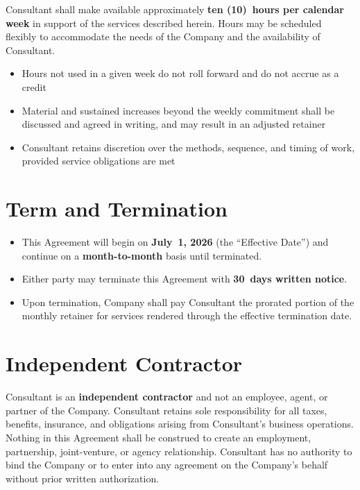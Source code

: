 \documentclass{toospoint}
\begin{document}
Consultant shall make available approximately \textbf{ten (10)~hours per
calendar week} in support of the services described herein. Hours may be
scheduled flexibly to accommodate the needs of the Company and the
availability of Consultant.

\begin{itemize}[leftmargin=1.5em, itemsep=4pt, topsep=4pt]
  \item Hours not used in a given week do not roll forward and do not accrue as a credit
  \item Material and sustained increases beyond the weekly commitment shall be discussed and agreed in writing, and may result in an adjusted retainer
  \item Consultant retains discretion over the methods, sequence, and timing of work, provided service obligations are met
\end{itemize}

\section{Term and Termination}

\begin{itemize}[leftmargin=1.5em, itemsep=4pt, topsep=4pt]
  \item This Agreement will begin on \textbf{July~1, 2026} (the ``Effective Date'') and continue on a \textbf{month-to-month} basis until terminated.
  \item Either party may terminate this Agreement with \textbf{30~days written notice}.
  \item Upon termination, Company shall pay Consultant the prorated portion of the monthly retainer for services rendered through the effective termination date.
\end{itemize}

\section{Independent Contractor}

Consultant is an \textbf{independent contractor} and not an employee, agent, or
partner of the Company. Consultant retains sole responsibility for all taxes,
benefits, insurance, and obligations arising from Consultant's business
operations. Nothing in this Agreement shall be construed to create an
employment, partnership, joint-venture, or agency relationship. Consultant has
no authority to bind the Company or to enter into any agreement on the
Company's behalf without prior written authorization.
\end{document}
